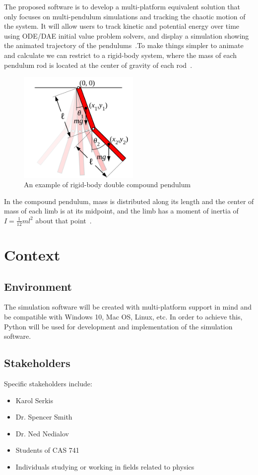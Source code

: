 \documentclass{article}
\begin{document}
The proposed software is to develop a multi-platform equivalent solution that
only focuses on multi-pendulum simulations and tracking the chaotic motion of
the system. It will allow users to track kinetic and potential energy over time 
using ODE/DAE initial value problem solvers, and display a simulation showing
the animated trajectory of the pendulums~\cite{DAETS}.To make things simpler
to animate and calculate we can restrict to a rigid-body system, where the mass 
of each pendulum rod is located at the center of gravity of each 
rod~\cite{DoublePendulum}.

\begin{figure}[!htb]
	\centering
	\includegraphics[width=220px]{Double-pendulum-rigid.png}
	\caption{An example of rigid-body double compound 
	pendulum~\cite{DoublePendulum}}
	\label{fig:multipend}
\end{figure}

In the compound pendulum, mass is distributed along its length and the center 
of mass of each limb is at its midpoint, and the limb has a moment of inertia 
of $I = \frac{1}{12}ml^2$ about that point~\cite{DoublePendulum}.

\section*{Context}
\subsection*{Environment}
The simulation software will be created with multi-platform support in mind and
be compatible with Windows 10, Mac OS, Linux, etc. In order to achieve this,
Python will be used for development and implementation of the simulation
software.

\subsection*{Stakeholders}
Specific stakeholders include:
\begin{itemize}
\item Karol Serkis
\item Dr. Spencer Smith
\item Dr. Ned Nedialov
\item Students of CAS 741 
\item Individuals studying or working in fields related to physics
\end{itemize}
\end{document}
